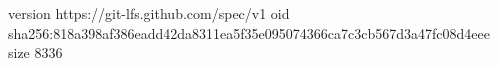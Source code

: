 version https://git-lfs.github.com/spec/v1
oid sha256:818a398af386eadd42da8311ea5f35e095074366ca7c3cb567d3a47fc08d4eee
size 8336
